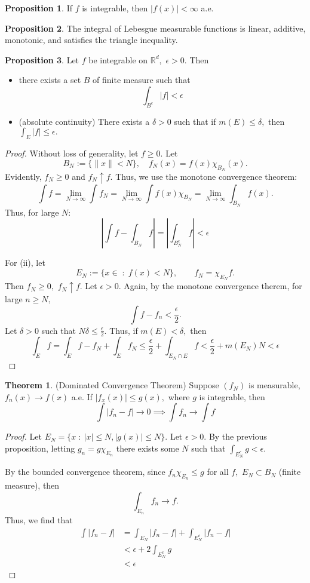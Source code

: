 \documentclass[10pt, oneside]{article}
\newcommand{\bbR}{\mathbb{R}}
\theoremstyle{definition}
\newtheorem{thm}{Theorem}
\newtheorem{prop}{Proposition}
\begin{document}
\begin{prop}
    If $f$ is integrable, then $|f(x)|< \infty$ a.e.
\end{prop}

\begin{prop}
    The integral of Lebesgue measurable functions is linear, additive, monotonic, and satisfies the triangle inequality.
\end{prop}

\begin{prop}
    Let $f$ be integrable on $\bbR^d,$ $\epsilon>0.$ Then 
    \begin{itemize}
        \item there exists a set $B$ of finite measure such that 
        \[\int_{B^c} |f| < \epsilon\]
        \item (absolute continuity) There exists a $\delta>0$ such that if $m(E) \leq \delta,$ then $\int_E |f|\leq \epsilon.$
    \end{itemize}
\end{prop}
\begin{proof}
    Without loss of generality, let $f\geq 0.$ Let 
    \[B_N := \{\|x\| < N\}, \quad f_N(x) = f(x)\chi_{B_N}(x).\] Evidently, $f_N \geq 0$ and $f_N \uparrow f.$ Thus, we use the monotone convergence theorem:
    \[\int f = \lim_{N\to \infty}\int f_N = \lim_{N\to \infty}\int f(x)\chi_{B_N} = \lim_{N\to \infty}\int_{B_N}f(x).\] Thus, for large $N:$
    \[|\int f- \int_{B_N} f| = |\int_{B_N^c} f| <\epsilon\]

    For (ii), let 
    \[E_N := \{x \in \; : \; f(x) < N\}, \qquad f_N = \chi_{E_N}f.\] Then $f_N \geq 0,$ $f_N \uparrow f.$ Let $\epsilon>0.$ Again, by the monotone convergence therem, for large $n \geq N,$
    \[\int f - f_n < \frac{\epsilon}{2}.\]  Let $\delta>0$ such that $N\delta \leq \frac{\epsilon}{2}.$ Thus, if $m(E) < \delta,$ then 
    \[\int_E f = \int_E f - f_N  + \int_E f_N \leq \frac{\epsilon}{2} + \int_{E_N \cap E}f < \frac{\epsilon}{2} + m(E_N) N < \epsilon\]
\end{proof}

\begin{thm}
    (Dominated Convergence Theorem) Suppose $(f_N)$ is measurable, $f_n(x)\to f(x)$ a.e. If $|f_x(x)|\leq g(x),$ where $g$ is integrable, then 
    \[\int |f_n - f|\to 0 \implies \int f_n \to \int f\]
\end{thm}

\begin{proof}
    Let $E_N = \{x\; : \: |x| \leq N, |g(x)| \leq N\}.$ Let $\epsilon>0.$ By the previous proposition, letting $g_n = g \chi_{E_n}$ there exists some $N$ such that $\int_{E_N^c}g < \epsilon.$ 

    By the bounded convergence theorem, since $f_n \chi_{E_n} \leq g$ for all $f,$ $E_N \subset B_N$ (finite measure), then 
    \[\int_{E_n} f_n \to f.\] Thus, we find that 
    \begin{align*}
        \int |f_n - f| &= \int_{E_N}|f_n - f| + \int_{E_N^c}|f_n - f|\\
        &< \epsilon + 2\int_{E_N^c}g\\
        &< \epsilon
    \end{align*}
\end{proof}
\end{document}
